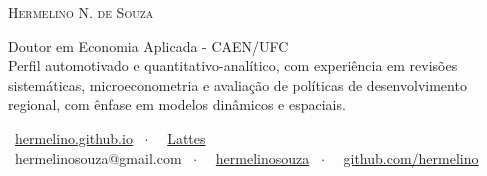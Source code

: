 \documentclass[a4paper,12pt]{article}
\begin{document}
	\par{\centering
		{\huge \textsc{Hermelino N. de Souza}}
		\par}

	\small
	\begin{center}
		Doutor em Economia Aplicada - CAEN/UFC \\
		\vspace{0.3cm}
		Perfil automotivado e quantitativo-analítico, com experiência em revisões sistemáticas, microeconometria e avaliação de políticas de desenvolvimento regional, com ênfase em modelos dinâmicos e espaciais.
	\end{center}

	\begin{center}
			\small
			\faHome \ \href{https://hermelino.github.io/}{hermelino.github.io} \ $\cdot$ \ \faUniversity \ \href{http://lattes.cnpq.br/3460004816166577}{Lattes}   \\ %
			\faEnvelope \ hermelinosouza@gmail.com \ $\cdot$ \ \faLinkedin \ \href{https://www.linkedin.com/in/hermelinosouza}{hermelinosouza} \ $\cdot$ \ \faGithub \ \href{https://github.com/hermelino}{github.com/hermelino} \\
	\end{center}
\end{document}
